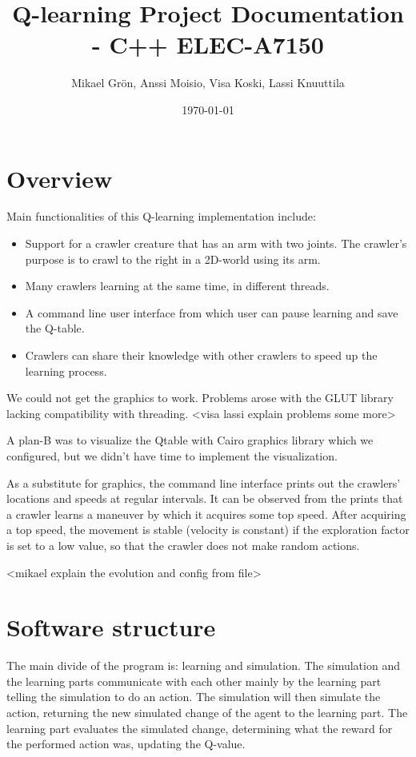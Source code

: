 \documentclass{article}
\author{Mikael Grön, Anssi Moisio, Visa Koski, Lassi Knuuttila}
\title{Q-learning Project Documentation - C++ ELEC-A7150}
\date{\today}
\begin{document}
\maketitle

\tableofcontents
\newpage

\section{Overview}

Main functionalities of this Q-learning implementation include:
\begin{itemize}
  \item Support for a crawler creature that has an arm with two joints. The
  crawler's purpose is to crawl to the right in a 2D-world using its arm.
  \item Many crawlers learning at the same time, in different threads.
  \item A command line user interface from which user can pause learning and
  save the Q-table.
  \item Crawlers can share their knowledge with other crawlers to speed up
  the learning process.
\end{itemize}

We could not get the graphics to work. Problems arose with
the GLUT library lacking compatibility with threading.
<visa lassi explain problems some more>

A plan-B was to visualize the Qtable with Cairo graphics library which we
configured, but we didn't have time to implement the visualization.

As a substitute for graphics, the command line interface prints out the
crawlers’ locations and speeds at regular intervals. It can be observed
from the prints that a crawler learns a maneuver by which it acquires some
top speed. After acquiring a top speed, the movement is stable (velocity is
constant) if the exploration factor is set to a low value, so that the crawler
does not make random actions.

<mikael explain the evolution and config from file>

\section{Software structure}

The main divide of the program is: learning and simulation. The
simulation and the learning parts communicate with each other mainly by the
learning part telling the simulation to do an action. The simulation will then
simulate the action, returning the new simulated change of the agent to the
learning part. The learning part evaluates the simulated change, determining
what the reward for the performed action was, updating the Q-value.
\end{document}
